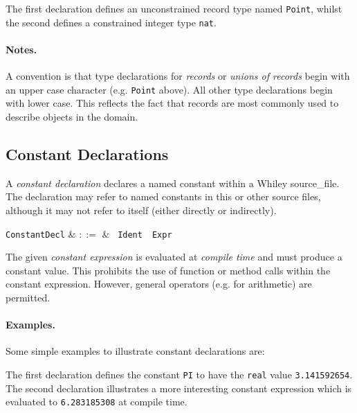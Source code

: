 

The first declaration defines an unconstrained record type named
\lstinline{Point}, whilst the second defines a constrained integer
type \lstinline{nat}.

\paragraph{Notes.}  A convention is that type declarations for {\em
  records} or {\em unions of records} begin with an upper case
character (e.g. \lstinline{Point} above).  All other type declarations
begin with lower case.  This reflects the fact that records are most
commonly used to describe objects in the domain.


\subsection{Constant Declarations}
\label{c_source_files_constant_decl}

A {\em constant declaration} declares a named constant within a Whiley \gls{source_file}.  The declaration may refer to named constants in this or other source files, although it may not refer to itself (either directly or indirectly).

\begin{syntax}
  \verb+ConstantDecl+ & $::=$ & \ \verb+Ident+\
  \ \verb+Expr+\\
\end{syntax}

The given {\em constant expression} is evaluated at {\em compile time}
and must produce a constant value.  This prohibits the use of function
or method calls within the constant expression.  However, general
operators (e.g. for arithmetic) are permitted.

\paragraph{Examples.}  Some simple examples to illustrate constant declarations are:



The first declaration defines the constant \lstinline{PI} to have the
\lstinline{real} value \lstinline{3.141592654}.  The second
declaration illustrates a more interesting constant expression which
is evaluated to \lstinline{6.283185308} at compile time.

